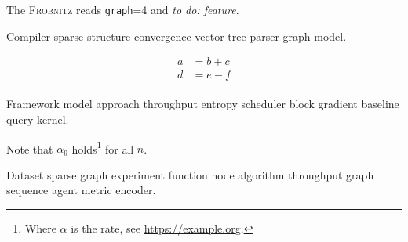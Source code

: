 \documentclass[twocolumn]{book}
\newcommand{\sys}{\textsc{Frobnitz}}
\newcommand{\kv}[2]{\texttt{#1}=#2}
\newcommand{\todoitem}[1]{\emph{to do: #1}}
\theoremstyle{definition}
\theoremstyle{remark}
\begin{document}
The \sys{} reads \kv{graph}{4} and \todoitem{feature}.

Compiler sparse structure convergence vector tree parser graph model.

\begin{align}
a &= b + c \\
d &= e - f \\
\end{align}

Framework model approach throughput entropy scheduler block gradient baseline query kernel.

Note that $\alpha_{9}$ holds\footnote{Where $\alpha$ is the rate, see \url{https://example.org}.} for all $n$.

Dataset sparse graph experiment function node algorithm throughput graph sequence agent metric encoder.
\end{document}
